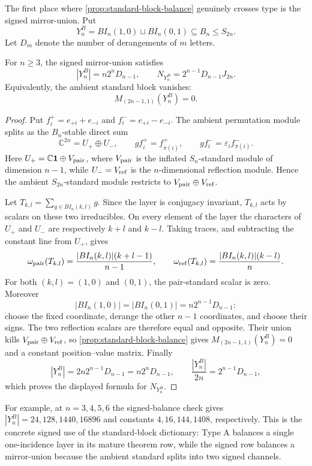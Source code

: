 The first place where \cref{prop:standard-block-balance} genuinely crosses type is the signed mirror-union.  Put
\[
  Y^B_n=BI_n(1,0)\sqcup BI_n(0,1)\subseteq B_n\leq S_{2n}.
\]
Let \(D_m\) denote the number of derangements of \(m\) letters.

\begin{proposition}\label{prop:signed-mirror-union-balance}
For \(n\geq 3\), the signed mirror-union satisfies
\[
  |Y^B_n|=n2^nD_{n-1},\qquad
  N_{Y^B_n}=2^{n-1}D_{n-1}J_{2n}.
\]
Equivalently, the ambient standard block vanishes:
\[
  M_{(2n-1,1)}(Y^B_n)=0.
\]
\end{proposition}

\begin{proof}
Put \(f_i^+=e_{+i}+e_{-i}\) and \(f_i^-=e_{+i}-e_{-i}\).  The ambient
permutation module splits as the \(B_n\)-stable direct sum
\[
  \mathbb C^{2n}=U_+\oplus U_-,\qquad
  g f_i^+=f_{\pi(i)}^+,\qquad
  g f_i^-=\varepsilon_i f_{\pi(i)}^-.
\]
Here \(U_+=\mathbb C\mathbf 1\oplus V_{\rm pair}\), where
\(V_{\rm pair}\) is the inflated \(S_n\)-standard module of dimension
\(n-1\), while \(U_-=V_{\rm ref}\) is the \(n\)-dimensional reflection
module.  Hence the ambient \(S_{2n}\)-standard module restricts to
\(V_{\rm pair}\oplus V_{\rm ref}\).

Let \(T_{k,l}=\sum_{g\in BI_n(k,l)}g\).  Since the layer is conjugacy
invariant, \(T_{k,l}\) acts by scalars on these two irreducibles.  On every
element of the layer the characters of \(U_+\) and \(U_-\) are respectively
\(k+l\) and \(k-l\).  Taking traces, and subtracting the constant line from
\(U_+\), gives
\[
  \omega_{\rm pair}(T_{k,l})
    =\frac{|BI_n(k,l)|(k+l-1)}{n-1},\qquad
  \omega_{\rm ref}(T_{k,l})
    =\frac{|BI_n(k,l)|(k-l)}{n}.
\]
For both \((k,l)=(1,0)\) and \((0,1)\), the pair-standard scalar is zero.
Moreover
\[
  |BI_n(1,0)|=|BI_n(0,1)|=n2^{n-1}D_{n-1}:
\]
choose the fixed coordinate, derange the other \(n-1\) coordinates, and
choose their signs.  The two reflection scalars are therefore equal and
opposite.  Their union kills \(V_{\rm pair}\oplus V_{\rm ref}\), so
\cref{prop:standard-block-balance} gives \(M_{(2n-1,1)}(Y_n^B)=0\) and a
constant position--value matrix.  Finally
\[
  |Y_n^B|=2n2^{n-1}D_{n-1}=n2^nD_{n-1},\qquad
  \frac{|Y_n^B|}{2n}=2^{n-1}D_{n-1},
\]
which proves the displayed formula for \(N_{Y_n^B}\).
\end{proof}

For example, at \(n=3,4,5,6\) the signed-balance check gives \(|Y^B_n|=24,128,1440,16896\) and constants \(4,16,144,1408\), respectively.  This is the concrete signed use of the standard-block dictionary: Type A balances a single one-incidence layer in its mature theorem row, while the signed row balances a mirror-union because the ambient standard splits into two signed channels.

